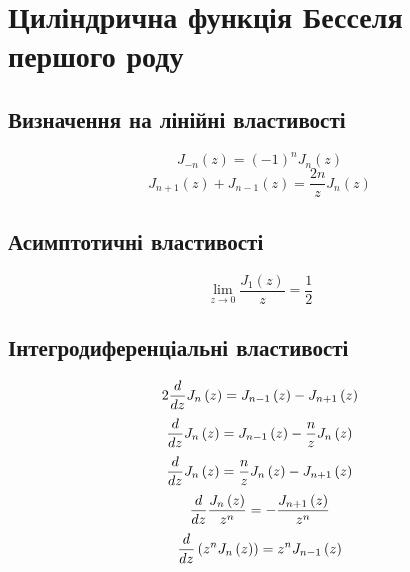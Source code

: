 \chapter{Циліндрична функція Бесселя першого роду}
\label{ch:bessel}

\section{Визначення на лінійні властивості}
%
\begin{equation}
J_{-n} \left( z \right) = \left( -1 \right)^n J_n \left( z \right)
\end{equation}
%
\begin{equation}
J_{n+1} \left( z \right) + J_{n-1} \left( z \right) = 
\frac{2n}{z} J_n \left( z \right)
\end{equation}

\section{Асимптотичні властивості}
%
\begin{equation} \label{eq:limJ1toZ}
\lim_{z \to 0} \left. \frac{J_1 \left( z \right)}{z} \right. = \frac{1}{2}
\end{equation}

\section{Інтегродиференціальні властивості}
%
\begin{equation}
2 \frac{d }{d z} J_n \left( z \right) = 
J_{n-1} \left( z \right) - J_{n+1} \left( z \right) 
\end{equation}
%
\begin{equation}
\frac{d }{d z} J_n \left( z \right) = 
J_{n-1} \left( z \right) - \frac{n}{z} J_{n} \left( z \right) 
\end{equation}
%
\begin{equation}
\frac{d }{d z} J_n \left( z \right) = 
\frac{n}{z} J_{n} \left( z \right) - J_{n+1} \left( z \right) 
\end{equation}
%
\begin{equation}
\frac{d }{d z} \frac{ J_n \left( z \right) }{ z^n }  = 
- \frac{ J_{n+1} \left( z \right) }{ z^n }
\end{equation}
%
\begin{equation}
\frac{d }{d z} \left( z^n J_n \left( z \right) \right)  = 
z^n J_{n-1} \left( z \right)
\end{equation}

